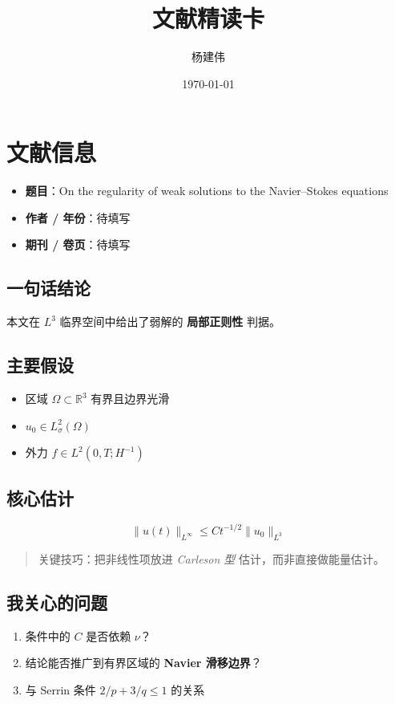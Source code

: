\documentclass[UTF8,a4paper,11pt,fontset=fandol]{ctexart}
\title{文献精读卡}
\author{杨建伟}
\date{\today}
\begin{document}
\maketitle
\section{文献信息}

\begin{itemize}
  \item \textbf{题目}：On the regularity of weak solutions to the Navier--Stokes equations
  \item \textbf{作者 / 年份}：待填写
  \item \textbf{期刊 / 卷页}：待填写
\end{itemize}

\subsection{一句话结论}

本文在 $L^3$ 临界空间中给出了弱解的 \textbf{局部正则性} 判据。

\subsection{主要假设}

\begin{itemize}
  \item 区域 $\Omega \subset \mathbb{R}^3$ 有界且边界光滑
  \item $u_0 \in L^2_\sigma(\Omega)$
  \item 外力 $f \in L^2(0,T;H^{-1})$
\end{itemize}

\subsection{核心估计}

\[
\|u(t)\|_{L^\infty} \le C t^{-1/2} \|u_0\|_{L^3}
\]

\begin{quote}
关键技巧：把非线性项放进 \textit{Carleson 型} 估计，而非直接做能量估计。
\end{quote}

\subsection{我关心的问题}

\begin{enumerate}
  \item 条件中的 $C$ 是否依赖 $\nu$？
  \item 结论能否推广到有界区域的 \textbf{Navier 滑移边界}？
  \item 与 Serrin 条件 $2/p + 3/q \le 1$ 的关系
\end{enumerate}
\end{document}
